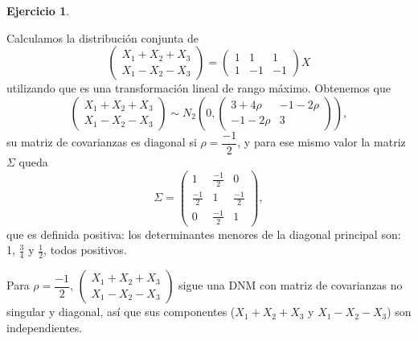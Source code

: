 \documentclass[12pt,spanish]{article}
\theoremstyle{definition}
\newtheorem{exercise}{Ejercicio}
\begin{document}
\begin{exercise}
  \begin{enumerate}[a)]
    Calculamos la distribución conjunta de
    \[
      \begin{pmatrix}
        X_1+X_2+X_3 \\
        X_1-X_2-X_3 
      \end{pmatrix}=
      \begin{pmatrix}
        1 & 1 & 1 \\
        1 & -1 & -1 
      \end{pmatrix}X
    \]
    utilizando que es una transformación lineal de rango máximo.
    Obtenemos que \[
      \begin{pmatrix}
        X_1+X_2+X_3 \\
        X_1-X_2-X_3 
      \end{pmatrix}\sim N_2\left(
        0,
        \begin{pmatrix}
          3+4\rho & -1-2\rho\\
          -1-2\rho & 3
      \end{pmatrix}
        \right),
    \]
    su matriz de covarianzas es diagonal si $\rho=\dfrac{-1}{2}$, y
    para ese mismo valor la matriz $\Sigma$ queda
    \[\Sigma=
      \begin{pmatrix}
        1 & \frac{-1}{2} & 0 \\
        \frac{-1}{2} & 1 & \frac{-1}{2} \\
        0 & \frac{-1}{2} & 1
      \end{pmatrix},
    \] que es definida positiva: los determinantes menores de la
    diagonal principal son: 1, $\frac{3}{4}$ y $\frac{1}{2}$, todos
    positivos.

    Para $\rho=\dfrac{-1}{2}$, $\begin{pmatrix}
        X_1+X_2+X_3 \\
        X_1-X_2-X_3 
      \end{pmatrix}$ sigue una DNM con matriz de covarianzas no
      singular y diagonal, así que sus componentes ($X_1+X_2+X_3$
      y $X_1-X_2-X_3$) son independientes.
  \end{enumerate}
\end{exercise}
\end{document}
